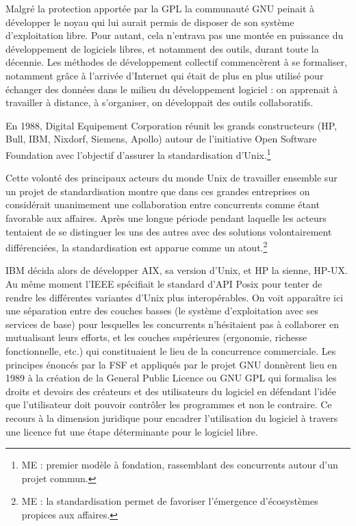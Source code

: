 \documentclass{FramateX}
\begin{document}
\begin{refsection}
Malgré la protection apportée par la GPL la communauté GNU peinait à
développer le noyau qui lui aurait permis de disposer de son système
d'exploitation libre. Pour autant, cela n'entrava pas
une montée en puissance du développement de logiciels libres, et
notamment des outils, durant toute la décennie. Les méthodes de
développement collectif commencèrent à se formaliser, notamment grâce à
l'arrivée d'Internet qui était de plus en plus utilisé pour échanger
des données dans le milieu du développement logiciel : on apprenait à
travailler à distance, à s'organiser, on développait des outils
collaboratifs. 

En 1988, Digital Equipement Corporation réunit les grands constructeurs
(HP, Bull, IBM, Nixdorf, Siemens, Apollo) autour de l'initiative Open
Software Foundation avec l'objectif d'assurer la standardisation
d'Unix.\footnote{ME : premier modèle à fondation,
rassemblant des concurrents autour d'un projet
commun.}

Cette volonté des principaux acteurs du monde Unix de travailler
ensemble sur un projet de standardisation montre que dans ces grandes
entreprises on considérait unanimement une collaboration entre
concurrents comme étant favorable aux affaires. Après une longue
période pendant laquelle les acteurs tentaient de se distinguer les uns
des autres avec des solutions volontairement différenciées, la
standardisation est apparue comme un atout.\footnote{ME : la
standardisation permet de favoriser l'émergence
d'écosystèmes propices aux affaires.}

IBM décida alors de développer AIX, sa version d'Unix,
et HP la sienne, HP-UX. Au même moment l'IEEE spécifiait le standard
d'API Posix pour tenter de rendre les différentes variantes d'Unix plus
interopérables. On voit apparaître ici une séparation entre des couches
basses (le système d'exploitation avec ses services de
base) pour lesquelles les concurrents n'hésitaient pas à collaborer en
mutualisant leurs efforts, et les couches supérieures (ergonomie,
richesse fonctionnelle, etc.) qui constituaient le lieu de la
concurrence commerciale. Les principes énoncés par la FSF et appliqués
par le projet GNU donnèrent lieu en 1989 à la création de la General
Public Licence ou GNU GPL qui formalisa les droits et devoirs des
créateurs et des utilisateurs du logiciel en défendant
l'idée que l'utilisateur doit pouvoir
contrôler les programmes et non le contraire. Ce recours à la dimension
juridique pour encadrer l'utilisation du logiciel à
travers une licence fut une étape déterminante pour le logiciel libre.


\end{refsection}
\end{document}
